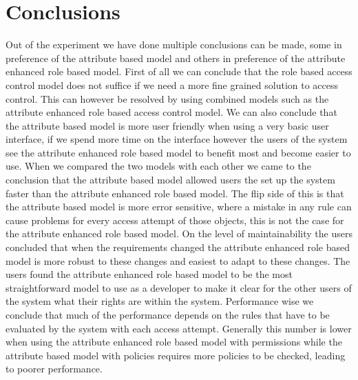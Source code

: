 \chapter{Conclusions}
\label{chapt:Conclusions}
Out of the experiment we have done multiple conclusions can be made, some in preference of the attribute based model and others in preference of the attribute enhanced role based model.
First of all we can conclude that the role based access control model does not suffice if we need a more fine grained solution to access control.
This can however be resolved by using combined models such as the attribute enhanced role based access control model.
We can also conclude that the attribute based model is more user friendly when using a very basic user interface, if we spend more time on the interface however the users of the system see the attribute enhanced role based model to benefit most and become easier to use.
When we compared the two models with each other we came to the conclusion that the attribute based model allowed users the set up the system faster than the attribute enhanced role based model.
The flip side of this is that the attribute based model is more error sensitive, where a mistake in any rule can cause problems for every access attempt of those objects, this is not the case for the attribute enhanced role based model.
On the level of maintainability the users concluded that when the requirements changed the attribute enhanced role based model is more robust to these changes and easiest to adapt to these changes.
The users found the attribute enhanced role based model to be the most straightforward model to use as a developer to make it clear for the other users of the system what their rights are within the system.
Performance wise we conclude that much of the performance depends on the rules that have to be evaluated by the system with each access attempt.
Generally this number is lower when using the attribute enhanced role based model with permissions while the attribute based model with policies requires more policies to be checked, leading to poorer performance.

